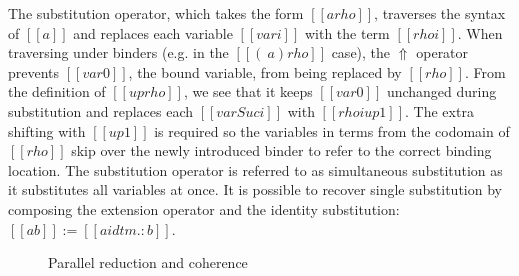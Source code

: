 \documentclass[acmsmall,screen=true,
\ifpublic review=false\else,review=true\fi
  ,anonymous=\ifanonymous true\else false\fi]{acmart}
\begin{document}
The substitution operator, which takes the form $[[a {rho}]]$,
traverses the syntax of $[[a]]$ and replaces each variable $[[var i]]$
with the term $[[rho i]]$. When traversing under binders (e.g. in the
$[[(\ a) { rho }]]$ case), the $\Uparrow$ operator prevents $[[var
0]]$, the bound variable, from being replaced by
$[[rho]]$. From the definition of $[[up rho]]$, we see that it keeps
$[[var 0]]$ unchanged during substitution and replaces each $[[var
Suc i]]$ with $[[rho i {up 1}]]$. The extra shifting with $[[up 1]]$
is required so the variables in terms from the codomain of $[[rho]]$ skip over
the newly introduced binder to refer to the correct binding
location. The substitution operator is referred to as simultaneous
substitution as it substitutes all variables at once. It is possible
to recover single substitution by composing the extension operator and
the identity substitution: $[[a { b }]] := [[a { idtm .: b }]]$.

\begin{figure}[h]
\begin{minipage}{0.9\textwidth}
\end{minipage}
\caption{Parallel reduction and coherence}
\label{fig:par}
\end{figure}
\end{document}
